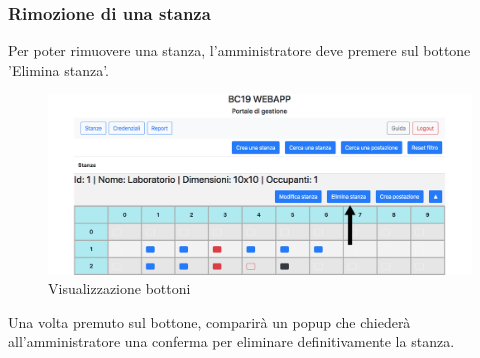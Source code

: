 \subsubsection{Rimozione di una stanza}
Per poter rimuovere una stanza, l'amministratore deve premere sul bottone 'Elimina stanza'.
\begin{figure}[H]
	\centering
	\includegraphics[width=15cm]{res/images/bottoneRemoveRoom.png}
	\caption{Visualizzazione bottoni}
\end{figure}
Una volta premuto sul bottone, comparirà un popup che chiederà all'amministratore una conferma per eliminare definitivamente la stanza.

